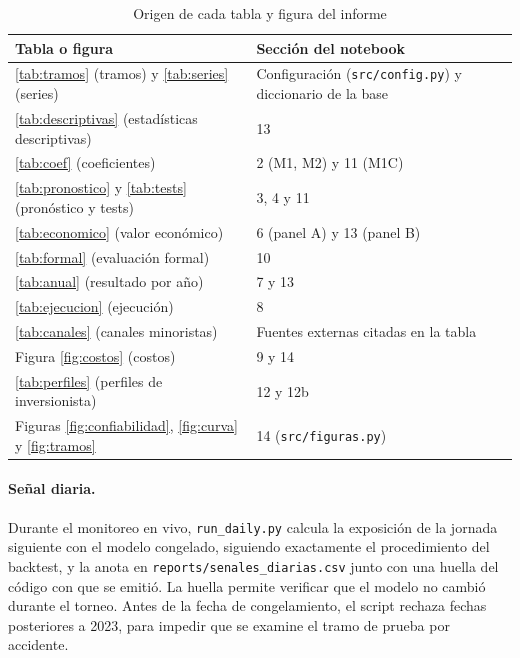 \documentclass[11pt,a4paper]{article}
\begin{document}
\begin{table}[htbp]\centering\small
\caption{Origen de cada tabla y figura del informe}\label{tab:origen}
\begin{tabular}{l l}
\toprule
Tabla o figura & Sección del notebook \\
\midrule
\ref{tab:tramos} (tramos) y \ref{tab:series} (series) & Configuración (\texttt{src/config.py}) y diccionario de la base \\
\ref{tab:descriptivas} (estadísticas descriptivas) & 13 \\
\ref{tab:coef} (coeficientes) & 2 (M1, M2) y 11 (M1C) \\
\ref{tab:pronostico} y \ref{tab:tests} (pronóstico y tests) & 3, 4 y 11 \\
\ref{tab:economico} (valor económico) & 6 (panel A) y 13 (panel B) \\
\ref{tab:formal} (evaluación formal) & 10 \\
\ref{tab:anual} (resultado por año) & 7 y 13 \\
\ref{tab:ejecucion} (ejecución) & 8 \\
\ref{tab:canales} (canales minoristas) & Fuentes externas citadas en la tabla \\
Figura \ref{fig:costos} (costos) & 9 y 14 \\
\ref{tab:perfiles} (perfiles de inversionista) & 12 y 12b \\
Figuras \ref{fig:confiabilidad}, \ref{fig:curva} y \ref{fig:tramos} & 14 (\texttt{src/figuras.py}) \\
\bottomrule
\end{tabular}
\end{table}

\paragraph{Señal diaria.} Durante el monitoreo en vivo, \texttt{run\_daily.py} calcula la exposición de la jornada siguiente con el modelo congelado, siguiendo exactamente el procedimiento del backtest, y la anota en \texttt{reports/senales\_diarias.csv} junto con una huella del código con que se emitió. La huella permite verificar que el modelo no cambió durante el torneo. Antes de la fecha de congelamiento, el script rechaza fechas posteriores a 2023, para impedir que se examine el tramo de prueba por accidente.
\end{document}
